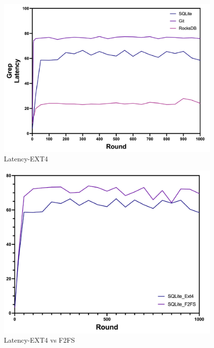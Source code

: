 \begin{figure}[t]
    \centering
	\includegraphics[width=0.95\columnwidth]{graphs/ext_latency}
	\caption{Latency-EXT4}
	\label{f:ext_latency}
\end{figure}

\begin{figure}[t]
    \centering
	\includegraphics[width=0.95\columnwidth]{graphs/f2fs_vs_ext4_latency}
	\caption{Latency-EXT4 vs F2FS}
	\label{f:f2fs_vs_ext4_latency}
\end{figure}

